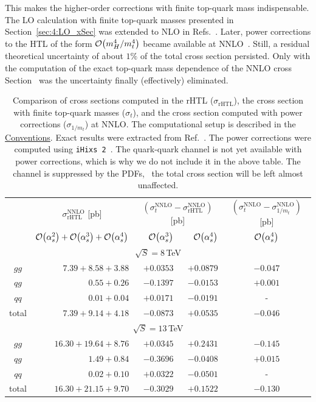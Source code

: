 This makes the higher-order corrections with finite top-quark mass indispensable. The \acs{LO} calculation with finite top-quark masses presented in Section~\ref{sec:4:LO_xSec} was extended to \acs{NLO} in Refs.~\cite{Djouadi:1991tka, Graudenz:1992pv}. Later, power corrections to the \acs{HTL} of the form $\mathcal{O}\!\left(m_H^4/m_t^4\right)$ became available at \acs{NNLO}~\cite{Harlander:2009mq, Harlander:2009my, Pak:2009dg}. Still, a residual theoretical uncertainty of about $1\%$ of the total cross section persisted. Only with the computation of the exact top-quark mass dependence of the \acs{NNLO} cross Section~\cite{Czakon:2021yub} was the uncertainty finally (effectively) eliminated.
\begin{table}[t!]

\centering
\begin{tabular}{c|r|rr|c}
\hline
\rule{0pt}{1em}
\multirow{2}{*}{channel} & \multicolumn{1}{c|}{$\sigma^\mathrm{NNLO}_\mathrm{rHTL}$ [pb]} &
\multicolumn{2}{c|}{$(\sigma^\mathrm{NNLO}_t-
\sigma^\mathrm{NNLO}_\mathrm{rHTL})$ [pb]} &
$(\sigma^\mathrm{NNLO}_t- \sigma^\mathrm{NNLO}_{1/m_t})$ [pb] \\
& $\mathcal{O}\!\left(\alpha_s^2\right)+\mathcal{O}\!\left(\alpha_s^3\right)+\mathcal{O}\!\left(\alpha_s^4\right)$ & \multicolumn{1}{r}{$\mathcal{O}\!\left(\alpha_s^3\right)$} & \multicolumn{1}{r|}{$\mathcal{O}\!\left(\alpha_s^4\right)$} & $\mathcal{O}\!\left(\alpha_s^4\right)$ \\
\hline
\multicolumn{5}{c}{\rule{0pt}{1em}$\sqrt{S} = 8$\,TeV}\\\hline
$gg$ & $7.39 + 8.58 + 3.88$ &  $+0.0353$ & $+0.0879$ & $-0.047$ \\
$qg$ & $0.55 + 0.26$ & $-0.1397$ & $-0.0153$ & $+0.001 $\\
$qq$ & $0.01 + 0.04$ & $+0.0171$ & $-0.0191$ & - \\\hline
total & $7.39 + 9.14 + 4.18$ &  $-0.0873$ & $+0.0535$ & $-0.046$ \\
\hline
\multicolumn{5}{c}{\rule{0pt}{1em}$\sqrt{S} = 13$\,TeV}\\\hline
$gg$ & $16.30 + 19.64 + 8.76$ & $+0.0345$ & $+0.2431$ & $-0.145$ \\
$qg$ & $1.49 + 0.84$ & $-0.3696$ & $-0.0408$ & $+0.015$ \\
$qq$ & $0.02 + 0.10$ & $+0.0322$ & $-0.0501$ & - \\\hline
total & $16.30 + 21.15 + 9.70$ & $-0.3029$ & $+0.1522$ & $-0.130$ \\
\hline
\end{tabular}
\caption{Comparison of cross sections computed in the \acs{rHTL} ($\sigma_\mathrm{rHTL}$), the cross section with finite top-quark masses ($\sigma_{t}$), and the cross section computed with power corrections ($\sigma_{1/m_t}$) at \acs{NNLO}. The computational setup is described in the \hyperref[chap:notation_and_conventions]{Conventions}. Exact results were extracted from Ref.~\cite{Czakon:2021yub}. The power corrections were computed using \texttt{iHixs 2}~\cite{Dulat:2018rbf}. The quark-quark channel is not yet available with power corrections, which is why we do not include it in the above table. The channel is suppressed by the \acs{PDF}s, \ie\ the total cross section will be left almost unaffected.} \label{tab:4:finite_top_quark_mass_effects}
\end{table}

